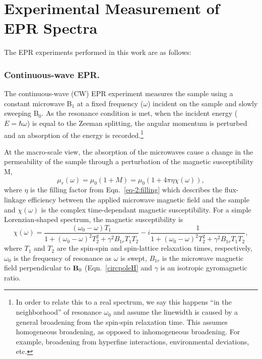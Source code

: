 \clearpage
\section{Experimental Measurement of EPR Spectra}
The EPR experiments performed in this work are as follows:

\subsubsection*{Continuous-wave EPR.}
The continuous-wave (CW) EPR experiment measures the sample using a constant microwave B$_1$ at a fixed frequency ($\omega$) incident on the sample and slowly sweeping B$_0$. As the resonance condition is met, when the incident energy ($E =\hbar \omega$) is equal to the Zeeman splitting, the angular momentum is perturbed and an absorption of the energy is recorded.\footnote{In order to relate this to a real spectrum, we say this happens ``in the neighborhood'' of resonance $\omega_0$ and assume the linewidth is caused by a general broadening from the spin-spin relaxation time. This assumes homogeneous broadening, as opposed to inhomogeneous broadening. For example, broadening from hyperfine interactions, environmental deviations, etc.}   

At the macro-scale view, the absorption of the microwaves cause a change in the permeability of the sample through a perturbation of the magnetic susceptibility M,
\begin{equation}
    \mu_r(\omega) = \mu_0 (1+M) = \mu_0 (1+ 4 \pi \eta \chi(\omega)), \label{eq-2:permea}
\end{equation} 
where $\eta$ is the filling factor from Eqn.~\ref{eq-2:filling} which describes the flux-linkage efficiency between the applied microwave magnetic field and the sample and $\chi(\omega)$ is the complex time-dependant magnetic susceptibility.\cite{schumacher1970introduction} For a simple Lorenzian-shaped spectrum, the magnetic susceptibility is 
\begin{equation}
      \chi(\omega) = \frac{(\omega_0 - \omega) T_1 }{1+(\omega_0 - \omega)^2T_2^2+\gamma^2 B_{1r} T_1 T_2}- i \frac{1}{1+(\omega_0 - \omega)^2T_2^2+\gamma^2 B_{1r} T_1 T_2}, \label{eq-2:chi}
\end{equation}
where $T_1$ and $T_2$ are the spin-spin and spin-lattice relaxation times, respectively, $\omega_0$ is the frequency of resonance as $\omega$ is swept, $B_{1r}$ is the microwave magnetic field perpendicular to $\textbf{B}_{0}$ (Eqn.~\ref{circpoleH} and $\gamma$ is an isotropic gyromagnetic ratio. \cite{abragam1961}

